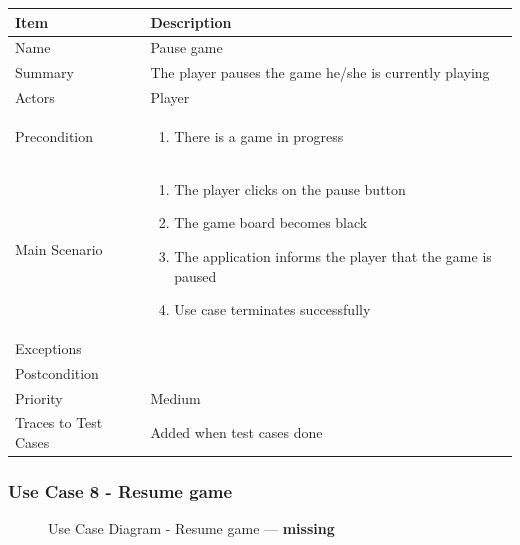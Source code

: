 \documentclass[12pt]{article}
\begin{document}
\begin{center}
\setlength{\tabcolsep}{18pt}
\renewcommand{\arraystretch}{1.3}
\begin{tabular}{ |p{3cm}|p{10cm}| }
    \hline
    \rowcolor{green}
   Item & Description \\
    \hline
    Name & Pause game \\
    \hline
    Summary & The player pauses the game he/she is currently playing \\
    \hline
    Actors & Player \\
    \hline
    Precondition & 
    \vspace*{-0.2in}
    \begin{enumerate}
        \item There is a game in progress
    \end{enumerate}  \\
    \hline
    Main Scenario &     
    \vspace*{-0.2in}
    \begin{enumerate}
        \item The player clicks on the pause button
        \item The game board becomes black
        \item The application informs the player that the game is paused
        \item Use case terminates successfully
    \end{enumerate}  \\
    \hline
    Exceptions &  \\
    \hline
    Postcondition & \\
    \hline
    Priority & Medium  \\
    \hline
    Traces to Test Cases & Added when test cases done  \\
    \hline
\end{tabular}
\end{center}

\newpage


\subsubsection{Use Case 8 - Resume game} \label{uc:8}

\begin{figure}[htbp]
    \centering
    \caption{Use Case Diagram - Resume game --- \textbf{missing}}
\end{figure}
\end{document}
